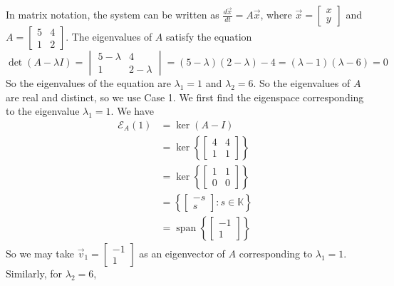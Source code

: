 \documentclass[11pt]{book}
\theoremstyle{definition}\newtheorem{definition}[subsection]{Definition}
\theoremstyle{definition}\newtheorem{example}[subsection]{Example}
\theoremstyle{definition}\newtheorem{notation}[subsection]{Notation}
\theoremstyle{definition}\newtheorem{remark}[subsection]{Remark}
\theoremstyle{theorem}\newtheorem{theorem}[subsection]{Theorem}
\theoremstyle{theorem}\newtheorem{lemma}[subsection]{Lemma}
\theoremstyle{theorem}\newtheorem{proposition}[subsection]{Proposition}
\theoremstyle{theorem}\newtheorem{corollary}[subsection]{Corollary}
\theoremstyle{theorem}\newtheorem{case}{Case}
\theoremstyle{remark}\newtheorem{subcase}{Subcase}[case]
\newcommand{\K}{\mathbb{K}}
\newcommand{\E}{\mathcal{E}}
\DeclareMathOperator{\Span}{span}
\begin{document}
In matrix notation, the system can be written as $\frac{d\vec{x}}{dt} = A\vec{x}$, where $\vec{x} = \begin{bmatrix} x \\ y \end{bmatrix}$ and $A = \begin{bmatrix} 5 & 4 \\ 1 & 2 \end{bmatrix}$. The eigenvalues of $A$ satisfy the equation
\begin{equation*}
    \det(A - \lambda I) = \begin{vmatrix} 5 - \lambda & 4 \\ 1 & 2 - \lambda \end{vmatrix} = (5 - \lambda)(2 - \lambda) - 4 = (\lambda - 1)(\lambda - 6) = 0
\end{equation*}
So the eigenvalues of the equation are $\lambda_1 = 1$ and $\lambda_2 = 6$. So the eigenvalues of $A$ are real and distinct, so we use Case 1. We first find the eigenspace corresponding to the eigenvalue $\lambda_1 = 1$. We have
\begin{align*}
    \E_A(1) &= \ker(A - I) \\
    &= \ker\left\{\begin{bmatrix} 4 & 4 \\ 1 & 1 \end{bmatrix}\right\} \\
    &= \ker\left\{\begin{bmatrix} 1 & 1 \\ 0 & 0 \end{bmatrix}\right\} \\
    &= \left\{\begin{bmatrix} -s \\ s \end{bmatrix} : s \in \K\right\} \\
    &= \Span\left\{\begin{bmatrix} -1 \\ 1 \end{bmatrix}\right\}
\end{align*}
So we may take $\vec{v}_1 = \begin{bmatrix} -1 \\ 1 \end{bmatrix}$ as an eigenvector of $A$ corresponding to $\lambda_1 = 1$. Similarly, for $\lambda_2 = 6$,
\end{document}

